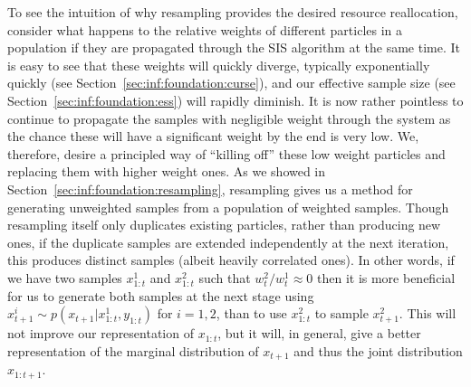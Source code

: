 To see the intuition of why resampling provides the desired resource reallocation, consider what happens 
to the relative weights of different particles in a population if they are propagated through the SIS algorithm at the
same time.  It is easy to see that these weights will quickly diverge, typically exponentially quickly
 (see Section~\ref{sec:inf:foundation:curse}), and our effective sample size 
(see Section~\ref{sec:inf:foundation:ess}) will rapidly diminish.  It is now rather pointless to continue to
propagate the samples with negligible weight through the system as the chance these will have a significant
weight by the end is very low.  We, therefore, desire a principled way of ``killing off'' these
low weight particles and replacing them with higher weight ones.  As we showed in Section~\ref{sec:inf:foundation:resampling},
resampling gives us a method for generating unweighted samples from a population of weighted samples.
Though resampling itself only duplicates existing particles, rather
than producing new ones, if the duplicate samples are extended independently at the next iteration, this
produces distinct samples (albeit heavily correlated ones).  In other words, if we have two samples
$x_{1:t}^1$ and $x_{1:t}^2$ such that $w_t^2/w_t^1 \approx 0$ then it is more beneficial for us to generate both
samples at the next stage using $x_{t+1}^i \sim p(x_{t+1} | x_{1:t}^1, y_{1:t})$ for $i=1,2$, than to use
$x_{1:t}^2$ to sample $x_{t+1}^2$.  This will not improve our representation of $x_{1:t}$, but it will, in
general, give a better representation of the marginal distribution of $x_{t+1}$ and thus the joint distribution
$x_{1:t+1}$.   

